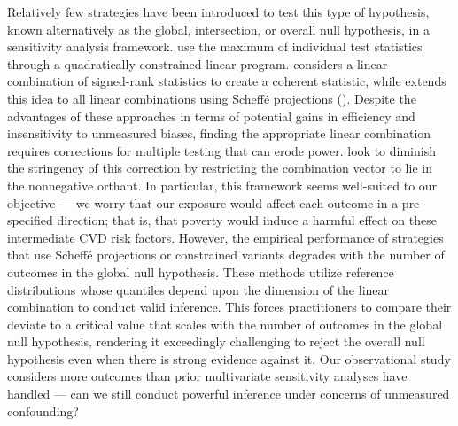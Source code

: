 \documentclass[12pt,leqno,titlepage]{amsart}
\newcommand{\1}{\mathbbm{1}}
\begin{document}
\begin{bibunit}
Relatively few strategies have been introduced to test this type of hypothesis, known alternatively as the global, intersection, or overall null hypothesis, in a sensitivity analysis framework. \cite{fogarty2016sensitivity} use the maximum of individual test statistics through a quadratically constrained linear program. \cite{rosenbaum1997signed} considers a linear combination of signed-rank statistics to create a coherent statistic, while \cite{rosenbaum2016using} extends this idea to all linear combinations using Scheff\'e projections (\citeyear{scheffe1953method}). Despite the advantages of these approaches in terms of potential gains in efficiency and insensitivity to unmeasured biases, finding the appropriate linear combination requires corrections for multiple testing that can erode power. \cite{cohen2020multivariate} look to diminish the stringency of this correction by restricting the combination vector to lie in the nonnegative orthant. In particular, this framework seems well-suited to our objective --- we worry that our exposure would affect each outcome in a pre-specified direction; that is, that poverty would induce a harmful effect on these intermediate CVD risk factors. However, the empirical performance of strategies that use Scheff\'e projections or constrained variants degrades with the number of outcomes in the global null hypothesis.
These methods utilize reference distributions whose quantiles depend upon the dimension of the linear combination to conduct valid inference. This forces practitioners to compare their deviate to a critical value that scales with the number of outcomes in the global null hypothesis, rendering it exceedingly challenging to reject the overall null hypothesis even when there is strong evidence against it.
Our observational study 
considers more outcomes than prior multivariate sensitivity analyses have handled --- can we still conduct powerful inference under concerns of unmeasured confounding?


\end{bibunit}
\end{document}
